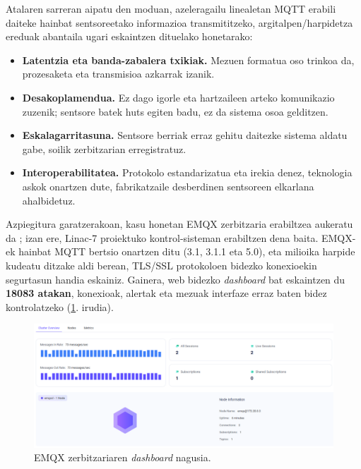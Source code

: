 \documentclass[12pt]{article}
\numberwithin{figure}{section}
\numberwithin{equation}{section}
\begin{document}
Atalaren sarreran aipatu den moduan, azeleragailu linealetan MQTT erabili daiteke hainbat sentsoreetako informazioa transmititzeko, argitalpen/harpidetza ereduak abantaila ugari eskaintzen dituelako honetarako:\\

\begin{itemize}
    \item \textbf{Latentzia eta banda-zabalera txikiak.} Mezuen formatua oso trinkoa da, prozesaketa eta transmisioa azkarrak izanik.
    \item \textbf{Desakoplamendua.} Ez dago igorle eta hartzaileen arteko komunikazio zuzenik; sentsore batek huts egiten badu, ez da sistema osoa gelditzen.
    \item \textbf{Eskalagarritasuna.} Sentsore berriak erraz gehitu daitezke sistema aldatu gabe, soilik zerbitzarian erregistratuz.
    \item \textbf{Interoperabilitatea.} Protokolo estandarizatua eta irekia denez, teknologia askok onartzen dute, fabrikatzaile desberdinen sentsoreen elkarlana ahalbidetuz.
\end{itemize}

Azpiegitura garatzerakoan, kasu honetan EMQX zerbitzaria erabiltzea aukeratu da \cite{inc_emqx_2025}; izan ere, Linac-7 proiektuko kontrol-sisteman erabiltzen dena baita. EMQX-ek hainbat MQTT bertsio onartzen ditu (3.1, 3.1.1 eta 5.0), eta milioika harpide kudeatu ditzake aldi berean, TLS/SSL protokoloen bidezko konexioekin segurtasun handia eskainiz. Gainera, web bidezko \textit{dashboard} bat eskaintzen du \textbf{18083 atakan}, konexioak, alertak eta mezuak interfaze erraz baten bidez kontrolatzeko (\ref{fig:emqx}. irudia).

\begin{figure}[h]
    \centering
    \includegraphics[width=\linewidth]{2 - Ingurunea/emqx.png}
    \caption{EMQX zerbitzariaren \textit{dashboard} nagusia.}
    \label{fig:emqx}
\end{figure}
\end{document}
